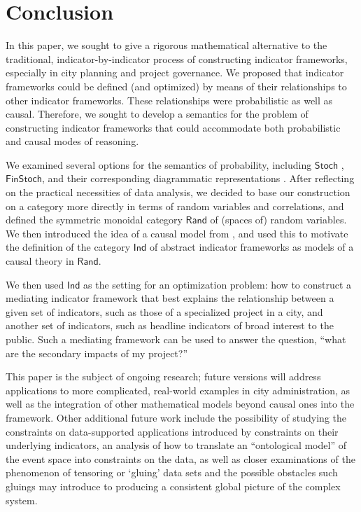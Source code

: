 \documentclass[sigconf]{acmart}
\newcommand{\Cat}[1]{\mathsf{#1}}
\def\Ind{\Cat{Ind}}
\def\Rand{\Cat{Rand}}
\def\Stoch{\Cat{Stoch}}
\def\FinStoch{\Cat{FinStoch}}
\begin{document}
\section{Conclusion}
In this paper, we sought to give a rigorous mathematical alternative to the traditional, indicator-by-indicator process of constructing indicator frameworks, especially in city planning and project governance. We proposed that indicator frameworks could be defined (and optimized) by means of their relationships to other indicator frameworks. These relationships were probabilistic as well as causal. Therefore, we sought to develop a semantics for the problem of constructing indicator frameworks that could accommodate both probabilistic and causal modes of reasoning.

We examined several options for the semantics of probability, including $\Stoch$ \cite{lawvere62}, $\FinStoch$, and their corresponding diagrammatic representations \cite{coecke_spekkens}. After reflecting on the practical necessities of data analysis, we decided to base our construction on a category more directly in terms of random variables and correlations, and defined the symmetric monoidal category $\Rand$ of (spaces of) random variables. We then introduced the idea of a causal model from \cite{fong13}, and used this to motivate the definition of the category $\Ind$ of abstract indicator frameworks as models of a causal theory in $\Rand$.

We then used $\Ind$ as the setting for an optimization problem: how to construct a mediating indicator framework that best explains the relationship between a given set of indicators, such as those of a specialized project in a city, and another set of indicators, such as headline indicators of broad interest to the public. Such a mediating framework can be used to answer the question, ``what are the secondary impacts of my project?''

This paper is the subject of ongoing research; future versions will address applications to more complicated, real-world examples in city administration, as well as the integration of other mathematical models beyond causal ones into the framework. Other additional future work include the possibility of studying the constraints on data-supported applications introduced by constraints on their underlying indicators, an analysis of how to translate an ``ontological model'' of the event space into constraints on the data, as well as closer examinations of the phenomenon of tensoring or `gluing' data sets and the possible obstacles such gluings may introduce to producing a consistent global picture of the complex system.
\end{document}
